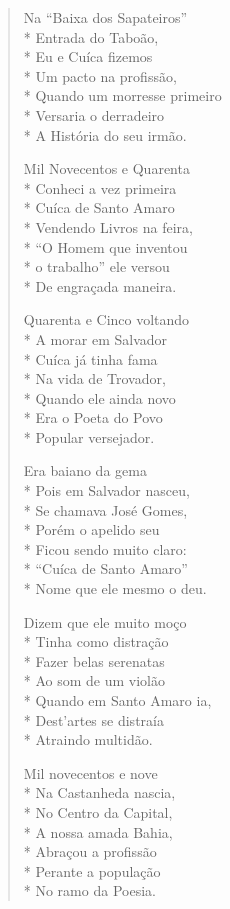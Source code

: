 \begin{verse}
Na ``Baixa dos Sapateiros''\\*
Entrada do Taboão,\\*
Eu e Cuíca fizemos\\*
Um pacto na profissão,\\*
Quando um morresse primeiro\\*
Versaria o derradeiro\\*
A História do seu irmão.

Mil Novecentos e Quarenta\\*
Conheci a vez primeira\\*
Cuíca de Santo Amaro\\*
Vendendo Livros na feira,\\*
``O Homem que inventou\\*
o trabalho'' ele versou\\*
De engraçada maneira.

Quarenta e Cinco voltando\\*
A morar em Salvador\\*
Cuíca já tinha fama\\*
Na vida de Trovador,\\*
Quando ele ainda novo\\*
Era o Poeta do Povo\\*
Popular versejador.

Era baiano da gema\\*
Pois em Salvador nasceu,\\*
Se chamava José Gomes,\\*
Porém o apelido seu\\*
Ficou sendo muito claro:\\*
``Cuíca de Santo Amaro''\\*
Nome que ele mesmo o deu.

Dizem que ele muito moço\\*
Tinha como distração\\*
Fazer belas serenatas\\*
Ao som de um violão\\*
Quando em Santo Amaro ia,\\*
Dest'artes se distraía\\*
Atraindo multidão.

Mil novecentos e nove\\*
Na Castanheda nascia,\\*
No Centro da Capital,\\*
A nossa amada Bahia,\\*
Abraçou a profissão\\*
Perante a população\\*
No ramo da Poesia.


\end{verse}

